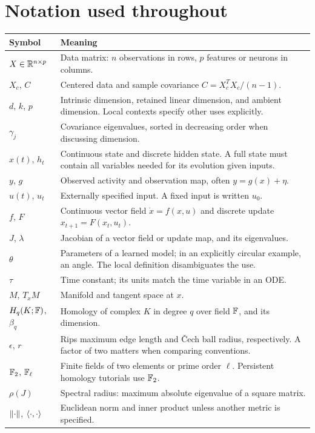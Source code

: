 \section*{Notation used throughout}
\begin{longtable}{>{\raggedright\arraybackslash}p{}>{\raggedright\arraybackslash}p{}}
\toprule Symbol & Meaning \\
\midrule\endhead
$X\in\mathbb{R}^{n\times p}$ & Data matrix: $n$ observations in rows, $p$ features or neurons in columns. \\
$X_c$, $C$ & Centered data and sample covariance $C=X_c^TX_c/(n-1)$. \\
$d$, $k$, $p$ & Intrinsic dimension, retained linear dimension, and ambient dimension. Local contexts specify other uses explicitly. \\
$\gamma_j$ & Covariance eigenvalues, sorted in decreasing order when discussing dimension. \\
$x(t)$, $h_t$ & Continuous state and discrete hidden state. A full state must contain all variables needed for its evolution given inputs. \\
$y$, $g$ & Observed activity and observation map, often $y=g(x)+\eta$. \\
$u(t)$, $u_t$ & Externally specified input. A fixed input is written $u_0$. \\
$f$, $F$ & Continuous vector field $\dot x=f(x,u)$ and discrete update $x_{t+1}=F(x_t,u_t)$. \\
$J$, $\lambda$ & Jacobian of a vector field or update map, and its eigenvalues. \\
$\theta$ & Parameters of a learned model; in an explicitly circular example, an angle. The local definition disambiguates the use. \\
$\tau$ & Time constant; its units match the time variable in an ODE. \\
$M$, $T_xM$ & Manifold and tangent space at $x$. \\
$H_q(K;\mathbb{F})$, $\beta_q$ & Homology of complex $K$ in degree $q$ over field $\mathbb{F}$, and its dimension. \\
$\epsilon$, $r$ & Rips maximum edge length and \v{C}ech ball radius, respectively. A factor of two matters when comparing conventions. \\
$\mathbb{F}_2$, $\mathbb{F}_\ell$ & Finite fields of two elements or prime order $\ell$. Persistent homology tutorials use $\mathbb{F}_2$. \\
$\rho(J)$ & Spectral radius: maximum absolute eigenvalue of a square matrix. \\
$\left\lVert \cdot\right\rVert$, $\left\langle \cdot,\cdot\right\rangle$ & Euclidean norm and inner product unless another metric is specified. \\
\bottomrule
\end{longtable}

